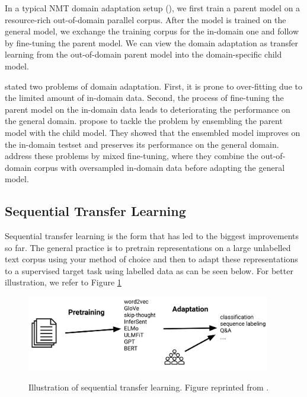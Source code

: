 In a typical NMT domain adaptation setup (\cite{luong2015stanford,Servan2016DomainSA,Chu2018ASO}), we first train a parent model on a resource-rich out-of-domain parallel corpus. After the model is trained on the general model, we exchange the training corpus for the in-domain one and follow by fine-tuning the parent model. We can view the domain adaptation as transfer learning from the out-of-domain parent model into the domain-specific child model.

\cite{Freitag2016FastDA} stated two problems of domain adaptation. First, it is prone to over-fitting due to the limited amount of in-domain data. Second, the process of fine-tuning the parent model on the in-domain data leads to deteriorating the performance on the general domain. \cite{Freitag2016FastDA} propose to tackle the problem by ensembling the parent model with the child model. They showed that the ensembled model improves on the in-domain testset and preserves its performance on the general domain. \cite{Chu2017AnEC} address these problems by mixed fine-tuning, where they combine the out-of-domain corpus with oversampled in-domain data before adapting the general model.

\subsection{Sequential Transfer Learning}
Sequential transfer learning is the form that has led to the biggest improvements so far. The general practice is to pretrain representations on a large unlabelled text corpus using your method of choice and then to adapt these representations to a supervised target task using labelled data as can be seen below. For better illustration, we refer to Figure \ref{img:seq_tl}

\begin{figure}[h]
    {\includegraphics[width=0.95\textwidth]{img/sequential_tl.png}}
    \centering
    \caption{Illustration of sequential transfer learning. Figure reprinted from \cite{ruder2019transfer}.}
    \label{img:seq_tl}
\end{figure}

